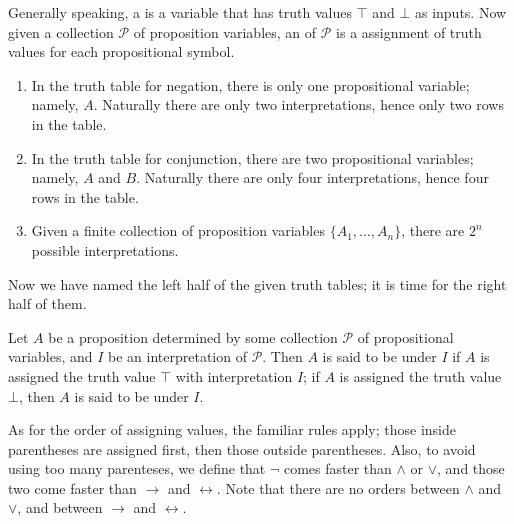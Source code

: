 \begin{definition}[Interpretation]
    \label{def:interpret}    
    Generally speaking,
    a 
    is a variable that has
    truth values \(\top\) and \(\bot\) as inputs.
    Now given a collection \(\mathcal P\) of proposition variables,
    an  of \(\mathcal P\)
    is a assignment of truth values for each propositional symbol.
\end{definition}

\begin{example}
    \begin{enumerate}[label=(\alph*)]
        \item In the truth table for negation,
        there is only one propositional variable; namely, \(A\).
        Naturally there are only two interpretations,
        hence only two rows in the table.

        \item In the truth table for conjunction,
        there are two propositional variables; namely, \(A\) and \(B\).
        Naturally there are only four interpretations,
        hence four rows in the table.

        \item Given a finite collection of proposition variables
        \(\{A_1,\dots,A_n\}\),
        there are \(2^n\) possible interpretations.
    \end{enumerate}
\end{example}

Now we have named the left half of the given truth tables;
it is time for the right half of them.

\begin{definition}
    \label{def:truth}
    Let \(A\) be a proposition
    determined by some collection \(\mathcal P\)
    of propositional variables,
    and \(I\) be an interpretation of \(\mathcal P\).
    Then \(A\) is said to be  under \(I\)
    if \(A\) is assigned the truth value \(\top\)
    with interpretation \(I\);
    if \(A\) is assigned the truth value \(\bot\),
    then \(A\) is said to be  under \(I\).
\end{definition}

As for the order of assigning values, the familiar rules apply;
those inside parentheses are assigned first,
then those outside parentheses.
Also, to avoid using too many parenteses,
we define that \(\neg\) comes faster than \(\wedge\) or \(\vee\),
and those two come faster than \(\to\) and \(\leftrightarrow\).
Note that
there are no orders between \(\wedge\) and \(\vee\),
and between \(\to\) and \(\leftrightarrow\).


